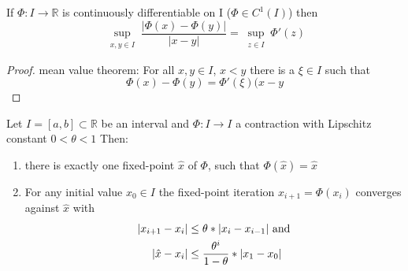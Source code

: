 \begin{lemma}
    If $\Phi: I \to  \mathbb{R}$ is continuously differentiable on I ($\Phi \in C^1(I)$) then
    \begin{equation*}
        \sup_{\substack{x,y \in I}} \frac{|\Phi(x)-\Phi(y)|}{|x-y|} = \sup_{\substack{z \in I}} \Phi'(z)
    \end{equation*}
\end{lemma}
\begin{proof}
    mean value theorem: For all $x,y \in I$, $x<y$ there is a $\xi \in I$ such that
    \begin{equation*}
        \Phi(x)-\Phi(y) = \Phi'(\xi)(x-y
    \end{equation*}
\end{proof}
\begin{theorem}
    Let $I=[a,b] \subset \mathbb{R}$ be an interval and $\Phi: I \to I$ a contraction with Lipschitz constant $0 < \theta < 1$
    Then:
    \begin{enumerate}[label=(\roman*)]
        \item there is exactly one fixed-point $\hat{x}$ of $\Phi$, such that $\Phi(\hat{x}) = \hat{x}$
        \item For any initial value $x_0 \in I$ the fixed-point iteration $x_{i+1} = \Phi(x_i)$ converges against $\hat{x}$ with
        \begin{align*}
            |x_{i+1}-x_i| &\leq \theta *|x_i-x_{i-1}|\hbox{ and}\\
            |\hat{x}-x_i| &\leq \frac{\theta^i}{1- \theta} * |x_1-x_0|
        \end{align*}
    \end{enumerate}
\end{theorem}
